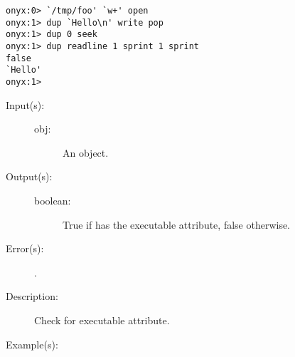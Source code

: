 \begin{description}
\begin{description}
\begin{verbatim}
onyx:0> `/tmp/foo' `w+' open
onyx:1> dup `Hello\n' write pop
onyx:1> dup 0 seek
onyx:1> dup readline 1 sprint 1 sprint
false
`Hello'
onyx:1>
		\end{verbatim}
	\end{description}
\label{systemdict:xcheck}
\item[{\onyxop{obj}{xcheck}{boolean}}: ]
	\begin{description}\item[]
	\item[Input(s): ]
		\begin{description}\item[]
		\item[obj: ]
			An object.
		\end{description}
	\item[Output(s): ]
		\begin{description}\item[]
		\item[boolean: ]
			True if  has the executable attribute, false
			otherwise.
		\end{description}
	\item[Error(s): ]
		\begin{description}\item[]
		\item[.]
		\end{description}
	\item[Description: ]
		Check  for executable attribute.
	\item[Example(s): ]\begin{verbatim}


\end{verbatim}
\end{description}
\end{description}

